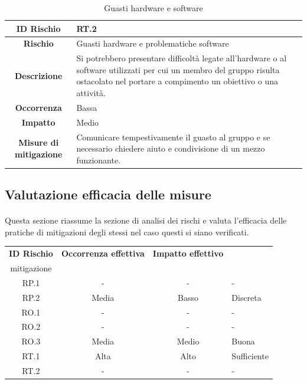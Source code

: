 \documentclass[10pt, a4paper]{article}
\begin{document}
{{{{{\renewcommand{\arraystretch}{1.5}
\begin{table}[H]
\begin{tabularx}{\textwidth}{c|X}
\textbf{ID Rischio} & RT.2 \\
\hline
\textbf{Rischio} & Guasti hardware e problematiche software \\
\hline
\textbf{Descrizione} & Si potrebbero presentare difficoltà legate all’hardware o al software utilizzati per cui un membro del gruppo risulta ostacolato nel portare a compimento un obiettivo o una attività. \\
\hline
\textbf{Occorrenza} & Bassa \\
\hline
\textbf{Impatto} & Medio\\
\hline
\textbf{Misure di mitigazione} & Comunicare tempestivamente il guasto al gruppo e se necessario chiedere aiuto e condivisione di un mezzo funzionante.\\
\end{tabularx}
\caption{Guasti hardware e software}
\end{table}


\subsection{Valutazione efficacia delle misure}
\paragraph{}Questa sezione riassume la sezione di analisi dei rischi e valuta l'efficacia delle pratiche di mitigazioni degli stessi nel caso questi si siano verificati.\\
{\renewcommand{\arraystretch}{1.5}
\begin{table}[H]
\begin{tabularx}{\textwidth}{c|c|c|X}
\textbf{ID Rischio} & \textbf{Occorrenza effettiva} & \textbf{Impatto effettivo} & \textbf{\quantities{Efficacia misure di \\mitigazione}} \\
\hline
RP.1 & - & - & -\\
\hline
RP.2 & Media & Basso & Discreta \\
\hline
RO.1 & - & - & -\\
\hline
RO.2 & - & - & -\\
\hline
RO.3 & Media & Medio & Buona\\
\hline
RT.1 & Alta & Alto & Sufficiente\\
\hline
RT.2 & - & - & -\\



\end{tabularx}
\end{table}}}}}}}
\end{document}
